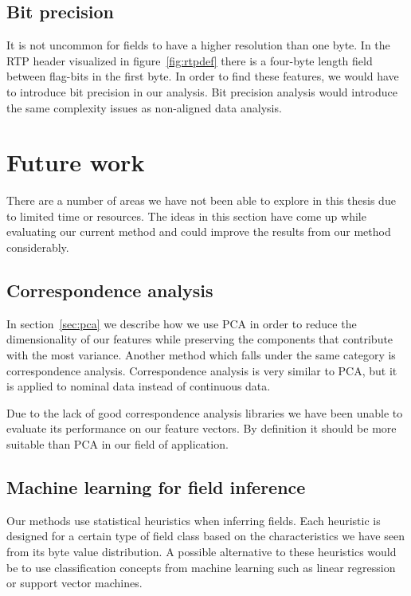 \documentclass[a4paper]{report}
\begin{document}
\subsection{Bit precision}
It is not uncommon for fields to have a higher resolution than one byte. In
the RTP header visualized in figure~\ref{fig:rtpdef} there is a four-byte
length field between flag-bits in the first byte. In order to find these
features, we would have to introduce bit precision in our analysis. Bit
precision analysis would introduce the same complexity issues as non-aligned
data analysis.


\section{Future work}
There are a number of areas we have not been able to explore in this thesis
due to limited time or resources. The ideas in this section have come up
while evaluating our current method and could improve the results from our
method considerably.

\subsection{Correspondence analysis}
In section~\ref{sec:pca} we describe how we use PCA in order to reduce the
dimensionality of our features while preserving the components that contribute
with the most variance. Another method which falls under the same category is
correspondence analysis. Correspondence analysis is very similar to PCA, but
it is applied to nominal data instead of continuous data.

Due to the lack of good correspondence analysis libraries we have been unable
to evaluate its performance on our feature vectors. By definition it should
be more suitable than PCA in our field of application.

\subsection{Machine learning for field inference}
Our methods use statistical heuristics when inferring fields. Each heuristic
is designed for a certain type of field class based on the characteristics we
have seen from its byte value distribution. A possible alternative to these
heuristics would be to use classification concepts from machine learning such
as linear regression or support vector machines.
\end{document}
